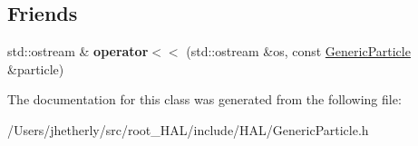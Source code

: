 \subsection*{Friends}
\begin{DoxyCompactItemize}
\item 
\hypertarget{class_h_a_l_1_1_generic_particle_a21417ca06cb919c843aa8c97cd734c1e}{std\-::ostream \& {\bfseries operator$<$$<$} (std\-::ostream \&os, const \hyperlink{class_h_a_l_1_1_generic_particle}{Generic\-Particle} \&particle)}\label{class_h_a_l_1_1_generic_particle_a21417ca06cb919c843aa8c97cd734c1e}

\end{DoxyCompactItemize}


The documentation for this class was generated from the following file\-:\begin{DoxyCompactItemize}
\item 
/\-Users/jhetherly/src/root\-\_\-\-H\-A\-L/include/\-H\-A\-L/Generic\-Particle.\-h\end{DoxyCompactItemize}
